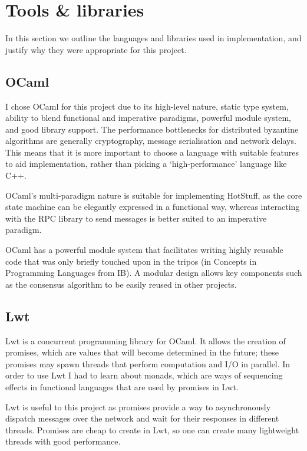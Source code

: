 \section{Tools \& libraries} \label{tools}
In this section we outline the languages and libraries used in implementation, and justify why they were appropriate for this project.

\subsection{OCaml}
I chose OCaml \cite{ocaml} for this project due to its high-level nature, static type system, ability to blend functional and imperative paradigms, powerful module system, and good library support. The performance bottlenecks for distributed byzantine algorithms are generally cryptography, message serialisation and network delays. This means that it is more important to choose a language with suitable features to aid implementation, rather than picking a `high-performance' language like C++.

OCaml's multi-paradigm nature is suitable for implementing HotStuff, as the core state machine can be elegantly expressed in a functional way, whereas interacting with the RPC library to send messages is better suited to an imperative paradigm.

OCaml has a powerful module system that facilitates writing highly reusable code that was only briefly touched upon in the tripos (in Concepts in Programming Languages from IB). A modular design allows key components such as the consensus algorithm to be easily reused in other projects.

\subsection{Lwt}
Lwt \cite{lwt} is a concurrent programming library for OCaml. It allows the creation of promises, which are values that will become determined in the future; these promises may spawn threads that perform computation and I/O in parallel. In order to use Lwt I had to learn about monads, which are ways of sequencing effects in functional languages that are used by promises in Lwt.

Lwt is useful to this project as promises provide a way to asynchronously dispatch messages over the network and wait for their responses in different threads. Promises are cheap to create in Lwt, so one can create many lightweight threads with good performance.

